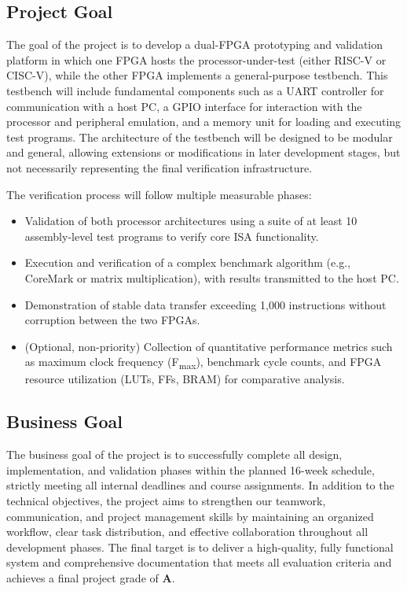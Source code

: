 \documentclass[10pt]{article}
\begin{document}
\subsection{Project Goal}
The goal of the project is to develop a dual-FPGA prototyping and validation platform in which one FPGA hosts the processor-under-test (either RISC-V or CISC-V), while the other FPGA implements a general-purpose testbench.  
This testbench will include fundamental components such as a UART controller for communication with a host PC, a GPIO interface for interaction with the processor and peripheral emulation, and a memory unit for loading and executing test programs.  
The architecture of the testbench will be designed to be modular and general, allowing extensions or modifications in later development stages, but not necessarily representing the final verification infrastructure.

The verification process will follow multiple measurable phases:
\begin{itemize}
    \item Validation of both processor architectures using a suite of at least 10 assembly-level test programs to verify core ISA functionality.
    \item Execution and verification of a complex benchmark algorithm (e.g., CoreMark or matrix multiplication), with results transmitted to the host PC.
    \item Demonstration of stable data transfer exceeding 1,000 instructions without corruption between the two FPGAs.
    \item (Optional, non-priority) Collection of quantitative performance metrics such as maximum clock frequency (F\textsubscript{max}), benchmark cycle counts, and FPGA resource utilization (LUTs, FFs, BRAM) for comparative analysis.
\end{itemize}

\subsection{Business Goal}
The business goal of the project is to successfully complete all design, implementation, and validation phases within the planned 16-week schedule, strictly meeting all internal deadlines and course assignments.  
In addition to the technical objectives, the project aims to strengthen our teamwork, communication, and project management skills by maintaining an organized workflow, clear task distribution, and effective collaboration throughout all development phases.  
The final target is to deliver a high-quality, fully functional system and comprehensive documentation that meets all evaluation criteria and achieves a final project grade of \textbf{A}.
\end{document}
